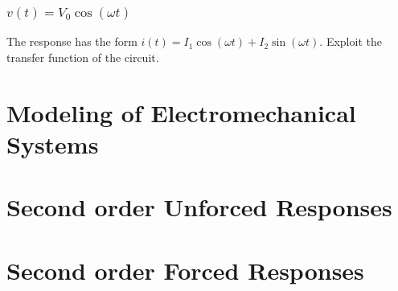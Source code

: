 \documentclass[a4paper,11pt]{article}
\begin{document}
	\subsubsection{$v(t) = V_0\cos(\omega t)$}
	The response has the form $i(t) = I_1\cos(\omega t) + I_2\sin(\omega t)$. Exploit the transfer function of the circuit. 
	
	\section{Modeling of Electromechanical Systems}
	\section{Second order Unforced Responses}
	\section{Second order Forced Responses}
	
	
\end{document}
